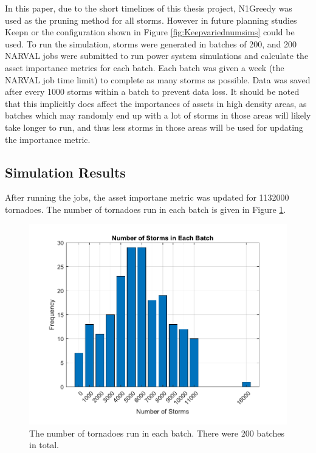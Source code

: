 \documentclass[12pt]{article}
\begin{document}
In this paper, due to the short timelines of this thesis project, N1Greedy was used as the pruning method for all storms. However in future planning studies Keepn or the configuration shown in Figure \ref{fig:Keepvariednumsims} could be used. To run the simulation, storms were generated in batches of 200, and 200 NARVAL jobs were submitted to run power system simulations and calculate the asset importance metrics for each batch. Each batch was given a week (the NARVAL job time limit) to complete as many storms as possible. Data was saved after every 1000 storms within a batch to prevent data loss. It should be noted that this implicitly does affect the importances of assets in high density areas, as batches which may randomly end up with a lot of storms in those areas will likely take longer to run, and thus less storms in those areas will be used for updating the importance metric.

\subsection{Simulation Results}
After running the jobs, the asset importane metric was updated for 1132000 tornadoes. The number of tornadoes run in each batch is given in Figure \ref{fig:numsimsperbatch}. 

\begin{figure}[ht]
    \centering %
    \includegraphics[scale = 0.6]{numsimsperbatch.pdf}
    \caption[Number of tornadoes run in each batch]{The number of tornadoes run in each batch. There were 200 batches in total.}
    \label{fig:numsimsperbatch}
\end{figure}
\end{document}
